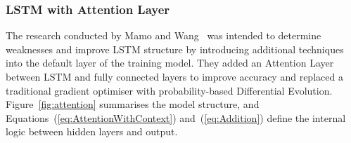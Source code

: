 \subsubsection{LSTM with Attention Layer}
The research conducted by Mamo and Wang~\cite{mamo_long_2020} was intended to determine weaknesses and improve LSTM structure by introducing additional techniques into the default layer of the training model. 
They added an Attention Layer~\cite{yang_hierarchical_2016} between LSTM and fully connected layers to improve accuracy and replaced a traditional gradient optimiser with probability-based Differential Evolution.
\mbox{Figure~\ref{fig:attention}} summarises the model structure, and \mbox{Equations~(\ref{eq:AttentionWithContext})} and~(\ref{eq:Addition}) define the internal logic between hidden layers and output.

